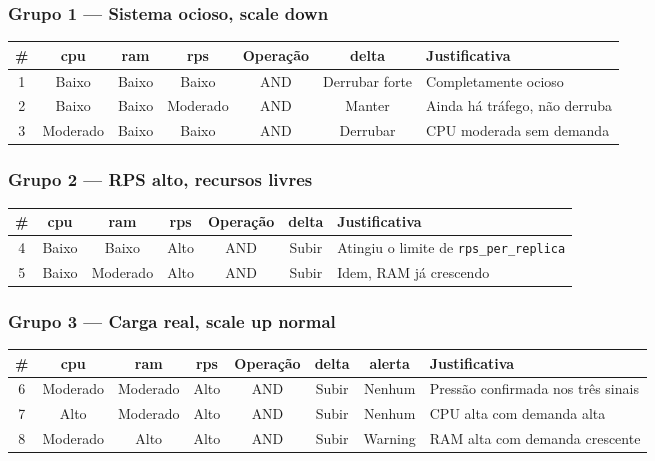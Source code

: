 \documentclass[12pt, a4paper]{article}
\begin{document}
\subsubsection{Grupo 1 — Sistema ocioso, scale down}
\begin{table}[H]
  \centering
  \begin{tabularx}{\textwidth}{ccccccX}
    \toprule
    \rowcolor{headerblue}
    \textbf{\#} & \textbf{cpu} & \textbf{ram} & \textbf{rps} & \textbf{Operação} & \textbf{delta} & \textbf{Justificativa} \\
    \midrule
    1 & Baixo    & Baixo & Baixo    & AND & Derrubar forte & Completamente ocioso \\
    2 & Baixo    & Baixo & Moderado & AND & Manter         & Ainda há tráfego, não derruba \\
    3 & Moderado & Baixo & Baixo    & AND & Derrubar       & CPU moderada sem demanda \\
    \bottomrule
  \end{tabularx}
\end{table}

\subsubsection{Grupo 2 — RPS alto, recursos livres}
\begin{table}[H]
  \centering
  \begin{tabularx}{\textwidth}{ccccccX}
    \toprule
    \rowcolor{headerblue}
    \textbf{\#} & \textbf{cpu} & \textbf{ram} & \textbf{rps} & \textbf{Operação} & \textbf{delta} & \textbf{Justificativa} \\
    \midrule
    4 & Baixo & Baixo    & Alto & AND & Subir & Atingiu o limite de \texttt{rps\_per\_replica} \\
    5 & Baixo & Moderado & Alto & AND & Subir & Idem, RAM já crescendo \\
    \bottomrule
  \end{tabularx}
\end{table}

\subsubsection{Grupo 3 — Carga real, scale up normal}
\begin{table}[H]
  \centering
  \begin{tabularx}{\textwidth}{cccccccX}
    \toprule
    \rowcolor{headerblue}
    \textbf{\#} & \textbf{cpu} & \textbf{ram} & \textbf{rps} & \textbf{Operação} & \textbf{delta} & \textbf{alerta} & \textbf{Justificativa} \\
    \midrule
    6 & Moderado & Moderado & Alto & AND & Subir & Nenhum  & Pressão confirmada nos três sinais \\
    7 & Alto     & Moderado & Alto & AND & Subir & Nenhum  & CPU alta com demanda alta \\
    8 & Moderado & Alto     & Alto & AND & Subir & Warning & RAM alta com demanda crescente \\
    \bottomrule
  \end{tabularx}
\end{table}
\end{document}
